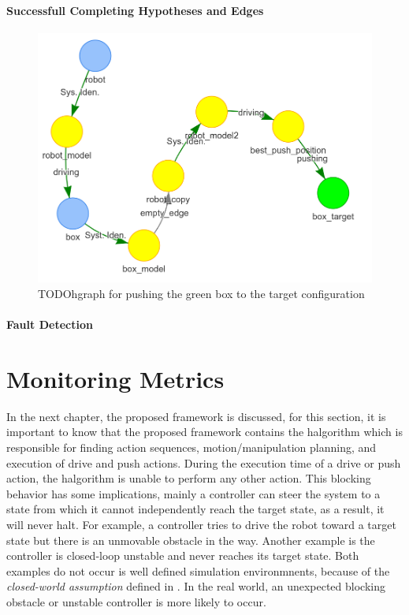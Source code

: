 \paragraph{Successfull Completing Hypotheses and Edges}


\begin{figure}[H]
    \centering
    \includegraphics[width=\textwidth]{figures/proposed_method/connecting_nodes/robot_push/robot_push_9}
    \caption{TODO\ac{hgraph} for pushing the green box to the target configuration}%
    \label{fig:robot_push_4}
\end{figure}


\paragraph{Fault Detection}

\section{Monitoring Metrics}%
\label{sec:monitoring_metrics}
In the next chapter, the proposed framework is discussed, for this section, it is important to know that the proposed framework contains the \ac{halgorithm} which is responsible for finding action sequences, motion/manipulation planning, and execution of drive and push actions. During the execution time of a drive or push action, the \acl{halgorithm} is unable to perform any other action. This blocking behavior has some implications, mainly a controller can steer the system to a state from which it cannot independently reach the target state, as a result, it will never halt. For example, a controller tries to drive the robot toward a target state but there is an unmovable obstacle in the way. Another example is the controller is closed-loop unstable and never reaches its target state. Both examples do not occur is well defined simulation environmnents, because of the \textit{closed-world assumption} defined in . In the real world, an unexpected blocking obstacle or unstable controller is more likely to occur.\bs

